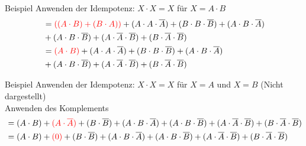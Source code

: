 \documentclass[12pt%
,aspectratio=169%
]{beamer}
\begin{document}
\begin{frame}{Beispiel}
Anwenden der Idempotenz: $X \cdot X = X$ für $X=A \cdot B$
\begin{align*}
&= \textcolor{red}{((A \cdot B) + (B \cdot A))} + (A \cdot A \cdot \overline{A}) + (B \cdot B \cdot \overline{B}) + (A \cdot B \cdot \overline{A}) \\
&+ (A \cdot B \cdot \overline{B}) + (A \cdot \overline{A} \cdot \overline{B}) + (B \cdot \overline{A} \cdot \overline{B})\\
&= \textcolor{red}{\left(A \cdot B\right)} + (A \cdot A \cdot \overline{A}) + (B \cdot B \cdot \overline{B}) + (A \cdot B \cdot \overline{A})\\
& + (A \cdot B \cdot \overline{B}) + (A \cdot \overline{A} \cdot \overline{B}) + (B \cdot \overline{A} \cdot \overline{B})
\end{align*}
\end{frame}

\begin{frame}{Beispiel}
Anwenden der Idempotenz: $X \cdot X = X$ für $X=A$ und $X=B$ (Nicht dargestellt)\\
Anwenden des Komplements
\begin{align*}
&=(A \cdot B) + \textcolor{red}{(A \cdot \overline{A})} + (B \cdot \overline{B}) + (A \cdot B \cdot \overline{A}) + (A \cdot B \cdot \overline{B}) + (A \cdot \overline{A} \cdot \overline{B}) + (B \cdot \overline{A} \cdot \overline{B})\\
&= (A \cdot B) + \textcolor{red}{(0)} + (B \cdot \overline{B}) + (A \cdot B \cdot \overline{A}) + (A \cdot B \cdot \overline{B}) + (A \cdot \overline{A} \cdot \overline{B}) + (B \cdot \overline{A} \cdot \overline{B})
\end{align*}
\end{frame}
\end{document}
